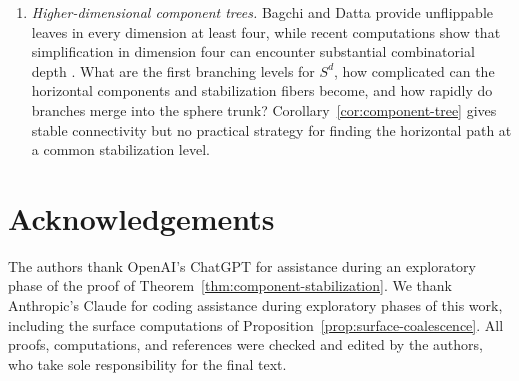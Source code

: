 \documentclass[11pt]{article}
\theoremstyle{remark}
\theoremstyle{plain}
\begin{document}
\begin{enumerate}
\item[\textbf{(Q4)}] \emph{Higher-dimensional component trees.}
Bagchi and Datta provide unflippable leaves in every dimension at
least four, while recent computations show that simplification in dimension
four can encounter substantial combinatorial depth \cite{BBS26}.  What are
the first branching levels for \(S^d\), how complicated can the horizontal
components and stabilization fibers become, and how rapidly do branches
merge into the sphere trunk?  Corollary~\ref{cor:component-tree} gives
stable connectivity but no practical strategy for finding the horizontal
path at a common stabilization level.

\end{enumerate}

\section*{Acknowledgements}

The authors thank OpenAI's ChatGPT for assistance during an
exploratory phase of the proof of
Theorem~\ref{thm:component-stabilization}.  We thank Anthropic's
Claude for coding assistance during exploratory phases of this work,
including the surface computations of
Proposition~\ref{prop:surface-coalescence}.  All proofs, computations,
and references were checked and edited by the authors, who take sole
responsibility for the final text.  
\end{document}
